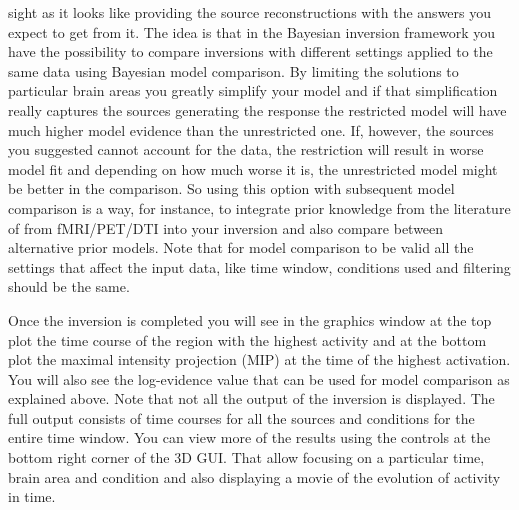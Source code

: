 sight as it looks like providing the source reconstructions with the answers you expect to get from it. The idea is that in the Bayesian inversion
framework you have the possibility to compare inversions with different settings applied to the same data using Bayesian model comparison. By limiting
the solutions to particular brain areas you greatly simplify your model and if that simplification really captures the sources generating the response
the restricted model will have much higher model evidence than the unrestricted one. If, however, the sources you suggested cannot account for the data,
the restriction will result in worse model fit and depending on how much worse it is, the unrestricted model might be better in the comparison. So using
this option with subsequent model comparison is a way, for instance, to integrate prior knowledge from the literature of from fMRI/PET/DTI into your
inversion and also compare between alternative prior models. Note that for model comparison to be valid all the settings that affect the input data,
like time window, conditions used and filtering should be the same.

Once the inversion is completed you will see in the graphics window at the top plot the time course of the region with the highest activity and
at the bottom plot the maximal intensity projection (MIP) at the time of the highest activation. You will also see the log-evidence value that can
be used for model comparison as explained above. Note that not all the output of the inversion is displayed. The full output consists of time courses
for all the sources and conditions for the entire time window. You can view more of the results using the controls at the bottom right corner
of the 3D GUI. That allow focusing on a particular time, brain area and condition and also displaying a movie of the evolution of activity in time.

